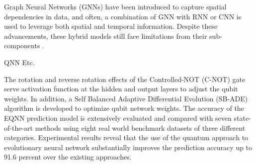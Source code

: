Graph Neural Networks (GNNs) have been introduced to capture spatial dependencies in data, and often, a combination of GNN with RNN or CNN is used to leverage both spatial and temporal information. Despite these advancements, these hybrid models still face limitations from their sub-components \cite{benidis2022deep}.

QNN
\cite{singh2021quantum}
Etc.

 The rotation and reverse rotation effects of the Controlled-NOT (C-NOT) gate serve activation function at the hidden and output layers to adjust the qubit weights. In addition, a Self Balanced Adaptive Differential Evolution (SB-ADE) algorithm is developed to optimize qubit network weights. The accuracy of the EQNN prediction model is extensively evaluated and compared with seven state-of-the-art methods using eight real world benchmark datasets of three different categories. Experimental results reveal that the use of the quantum approach to evolutionary neural network substantially improves the prediction accuracy up to 91.6 percent over the existing approaches.


